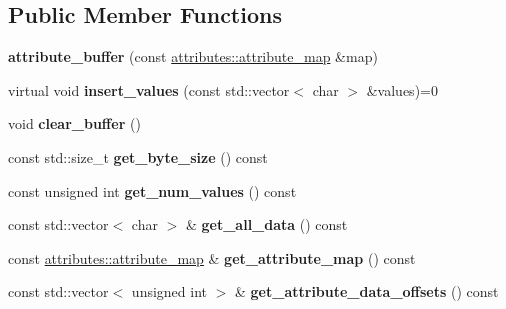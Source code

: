 \subsection*{Public Member Functions}
\begin{DoxyCompactItemize}
\item 
\hypertarget{classoccluded_1_1buffers_1_1attribute__buffer_a7c3a087b1ec1c67ba66e2385050d1139}{{\bfseries attribute\+\_\+buffer} (const \hyperlink{classoccluded_1_1buffers_1_1attributes_1_1attribute__map}{attributes\+::attribute\+\_\+map} \&map)}\label{classoccluded_1_1buffers_1_1attribute__buffer_a7c3a087b1ec1c67ba66e2385050d1139}

\item 
\hypertarget{classoccluded_1_1buffers_1_1attribute__buffer_ad9140b1308d096412fafe62c2c926cbb}{virtual void {\bfseries insert\+\_\+values} (const std\+::vector$<$ char $>$ \&values)=0}\label{classoccluded_1_1buffers_1_1attribute__buffer_ad9140b1308d096412fafe62c2c926cbb}

\item 
\hypertarget{classoccluded_1_1buffers_1_1attribute__buffer_aebf3845db925a130cc87bafe0d4b610a}{void {\bfseries clear\+\_\+buffer} ()}\label{classoccluded_1_1buffers_1_1attribute__buffer_aebf3845db925a130cc87bafe0d4b610a}

\item 
\hypertarget{classoccluded_1_1buffers_1_1attribute__buffer_abb50ede9ca40b4b8a399c0a85d632092}{const std\+::size\+\_\+t {\bfseries get\+\_\+byte\+\_\+size} () const }\label{classoccluded_1_1buffers_1_1attribute__buffer_abb50ede9ca40b4b8a399c0a85d632092}

\item 
\hypertarget{classoccluded_1_1buffers_1_1attribute__buffer_af1b2464149cdd1f2e7cb19080158c977}{const unsigned int {\bfseries get\+\_\+num\+\_\+values} () const }\label{classoccluded_1_1buffers_1_1attribute__buffer_af1b2464149cdd1f2e7cb19080158c977}

\item 
\hypertarget{classoccluded_1_1buffers_1_1attribute__buffer_af6e35e41f03ccd70451c9ed5e112f3b8}{const std\+::vector$<$ char $>$ \& {\bfseries get\+\_\+all\+\_\+data} () const }\label{classoccluded_1_1buffers_1_1attribute__buffer_af6e35e41f03ccd70451c9ed5e112f3b8}

\item 
\hypertarget{classoccluded_1_1buffers_1_1attribute__buffer_af1b72cfa4129a03466ba6fe7696fdbc3}{const \hyperlink{classoccluded_1_1buffers_1_1attributes_1_1attribute__map}{attributes\+::attribute\+\_\+map} \& {\bfseries get\+\_\+attribute\+\_\+map} () const }\label{classoccluded_1_1buffers_1_1attribute__buffer_af1b72cfa4129a03466ba6fe7696fdbc3}

\item 
\hypertarget{classoccluded_1_1buffers_1_1attribute__buffer_a40a7fe499682771a9cfd21f254c326b5}{const std\+::vector$<$ unsigned int $>$ \& {\bfseries get\+\_\+attribute\+\_\+data\+\_\+offsets} () const }\label{classoccluded_1_1buffers_1_1attribute__buffer_a40a7fe499682771a9cfd21f254c326b5}

\end{DoxyCompactItemize}
